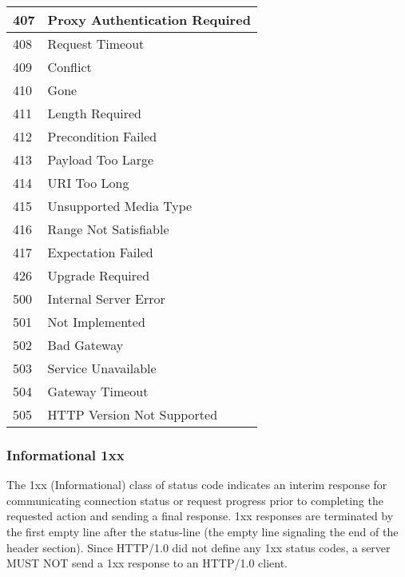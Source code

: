 \begin{longtable}{|l|l|}
   \\ \hline 407  & Proxy Authentication Required 
   \\ \hline 408  & Request Timeout               
   \\ \hline 409  & Conflict                      
   \\ \hline 410  & Gone                          
   \\ \hline 411  & Length Required               
   \\ \hline 412  & Precondition Failed           
   \\ \hline 413  & Payload Too Large             
   \\ \hline 414  & URI Too Long                  
   \\ \hline 415  & Unsupported Media Type        
   \\ \hline 416  & Range Not Satisfiable         
   \\ \hline 417  & Expectation Failed            
   \\ \hline 426  & Upgrade Required              
   \\ \hline 500  & Internal Server Error         
   \\ \hline 501  & Not Implemented               
   \\ \hline 502  & Bad Gateway                   
   \\ \hline 503  & Service Unavailable           
   \\ \hline 504  & Gateway Timeout               
   \\ \hline 505  & HTTP Version Not Supported    
   \\ \hline
\end{longtable}

   
   
   \subsubsection*{Informational 1xx}

   The 1xx (Informational) class of status code indicates an interim
   response for communicating connection status or request progress
   prior to completing the requested action and sending a final
   response. 1xx responses are terminated by the first empty line after
   the status-line (the empty line signaling the end of the header
   section).  Since HTTP/1.0 did not define any 1xx status codes, a
   server MUST NOT send a 1xx response to an HTTP/1.0 client.

  


